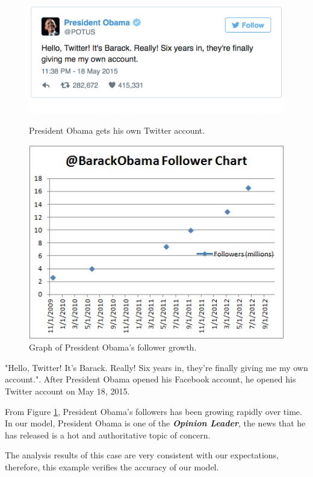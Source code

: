 \documentclass[a4paper,11pt]{article}
\begin{document}
\begin{figure}[!h]
  \centering %
  \begin{minipage}[t]{.49\linewidth}
  \includegraphics[width=1\textwidth]{./Pic/obama.png}
  \caption{President Obama gets his own Twitter account.}
  \end{minipage}
  \begin{minipage}[t]{.49\linewidth}
  \includegraphics[width=1\textwidth]{./Pic/p5.jpg}
  \caption{Graph of President Obama's follower growth.\cite{RG}}
  \label{fig:p5}
  \end{minipage}
\end{figure}
\par "Hello, Twitter! It's Barack. Really! Six years in, they're finally giving me my own account.". After President Obama opened his Facebook account, he opened his Twitter account on May 18, 2015.
\par From Figure \ref{fig:p5}, President Obama's followers has been growing rapidly over time. In our model, President Obama is one of the \textbf{\emph{Opinion Leader}}, the news that he has released is a hot and authoritative topic of concern.
\par The analysis results of this case are very consistent with our expectations, therefore, this example verifies the accuracy of our model.
\end{document}
